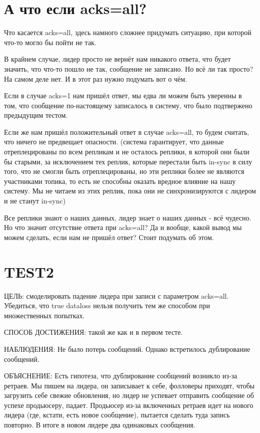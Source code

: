 \documentclass[11pt]{article}
\begin{document}
    \section{А что если acks=all?}
    Что касается acks=all, здесь намного сложнее придумать ситуацию, при которой что-то могло бы пойти не так.

    В крайнем случае, лидер просто не вернёт нам никакого ответа, что будет значить, что что-то пошло не так, сообщение не записано. Но всё ли так просто? На самом деле нет. И в этот раз нужно подумать вот о чём.

    Если в случае acks=1 нам пришёл ответ, мы едва ли можем быть уверенны в  том, что сообщение по-настоящему записалось в систему, что было подтвержено предыдущим тестом.

    Если же нам пришёл положительный ответ в случае acks=all, то будем считать, что ничего не предвещает опасности. (система гарантирует, что данные отреплецированы по всем репликам и не осталось реплики, в которой они были бы старыми, за исключением тех реплик, которые перестали быть in-sync в силу того, что не смогли быть отреплецированы, но эти реплики более не являются участниками топика, то есть не способны оказать вредное влияние на нашу систему. Мы не читаем из этих реплик, пока они не синхронизируются с лидером и не станут in-sync)

    Все реплики знают о наших данных, лидер знает о наших данных - всё чудесно. Но что значит отсутствие ответа при acks=all? Да и вообще, какой вывод мы можем сделать, если нам не пришёл ответ? Стоит подумать об этом.

    \section{TEST2}
    ЦЕЛЬ: смоделировать падение лидера при записи с параметром acks=all. Убедиться, что true dataloss нельзя получить тем же способом при множественных попытках.

    СПОСОБ ДОСТИЖЕНИЯ: такой же как и в первом тесте.

    НАБЛЮДЕНИЯ: Не было потерь сообщений. Однако встретилось дублирование сообщений.

    ОБЪЯСНЕНИЕ: Есть гипотеза, что дублирование сообщений возникло из-за ретраев. Мы пишем на лидера, он записывает к
    себе, фолловеры приходят, чтобы загрузить себе свежие обновления, но лидер не успевает отправить сообщение об
    успехе продьюсеру, падает. Продьюсер из-за включенных ретраев идет на нового лидера (где, кстати, есть
    новое сообщение), пытается сделать туда запись повторно. В итоге в новом лидере два одинаковых сообщения.
\end{document}
